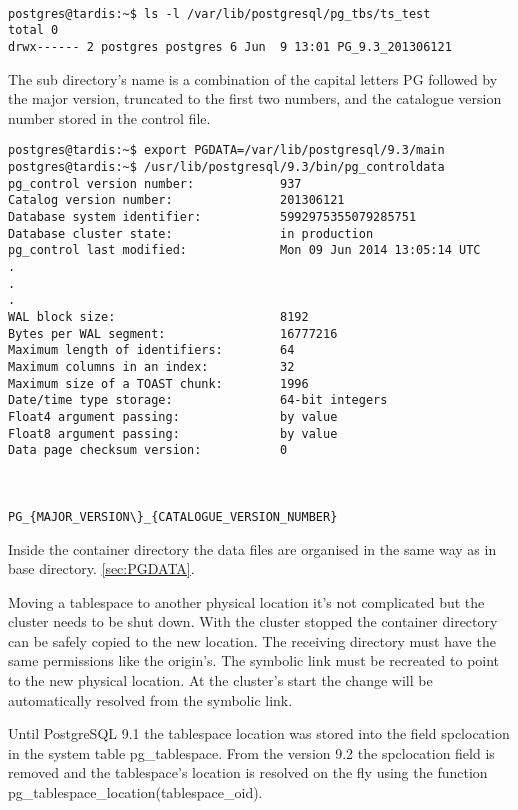 \begin{verbatim}

postgres@tardis:~$ ls -l /var/lib/postgresql/pg_tbs/ts_test
total 0
drwx------ 2 postgres postgres 6 Jun  9 13:01 PG_9.3_201306121

\end{verbatim}

The sub directory's name is a combination of the capital letters PG followed by the major version,
truncated to the first two numbers, and the catalogue version number stored in the control file.\newline



\begin{verbatim}
postgres@tardis:~$ export PGDATA=/var/lib/postgresql/9.3/main
postgres@tardis:~$ /usr/lib/postgresql/9.3/bin/pg_controldata
pg_control version number:            937
Catalog version number:               201306121
Database system identifier:           5992975355079285751
Database cluster state:               in production
pg_control last modified:             Mon 09 Jun 2014 13:05:14 UTC
.
.
.
WAL block size:                       8192
Bytes per WAL segment:                16777216
Maximum length of identifiers:        64
Maximum columns in an index:          32
Maximum size of a TOAST chunk:        1996
Date/time type storage:               64-bit integers
Float4 argument passing:              by value
Float8 argument passing:              by value
Data page checksum version:           0



PG_{MAJOR_VERSION\}_{CATALOGUE_VERSION_NUMBER}

\end{verbatim}



Inside the container directory the data files are organised in the same way as in base directory.
\ref{sec:PGDATA}.\newline

Moving a tablespace to another physical location it's not complicated but the cluster needs to be shut down.
With the cluster stopped the container directory can be safely copied to the new location. The receiving
directory must have the same permissions  like the origin's. The symbolic link must be recreated to point
to the new physical location. At the cluster's start the change will be automatically resolved from
the symbolic link.\newline

Until PostgreSQL 9.1 the tablespace location was stored into the field spclocation in the system table
pg\_tablespace. From the version 9.2 the spclocation field is removed and the
tablespace's location is resolved on the fly using the function
pg\_tablespace\_location(tablespace\_oid).\newline

